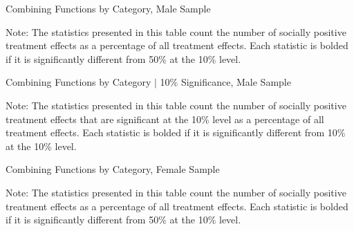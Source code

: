 	\begin{sidewaystable}[H]
	\begin{threeparttable}
     \caption{Combining Functions by Category, Male Sample} 
     \label{table:abccare_rslt_male_counts_n50a100_all}
	
		\begin{tablenotes}
	\footnotesize
	\item Note: The statistics presented in this table count the number of socially positive treatment 
	 effects as a percentage of all treatment effects. Each statistic is bolded if it is significantly
	 different from 50\% at the 10\% level.
	\end{tablenotes}
	\end{threeparttable}
	\end{sidewaystable}   

	\begin{sidewaystable}[H]
	\begin{threeparttable}
     \caption{Combining Functions by Category $|$ 10\% Significance, Male Sample} 
     \label{table:abccare_rslt_male_counts_n10a10_all}
	
	\begin{tablenotes}
	\footnotesize
	\item Note: The statistics presented in this table count the number of socially positive treatment 
	effects that are significant at the 10\% level as a percentage of all treatment effects. Each statistic
	is bolded if it is significantly different from 10\% at the 10\% level.
	\end{tablenotes}
	\end{threeparttable}
	\end{sidewaystable}   

	\begin{sidewaystable}[H]
	\begin{threeparttable}
     \caption{Combining Functions by Category, Female Sample} 
     \label{table:abccare_rslt_female_counts_n50a100_all}
	
	\begin{tablenotes}
	\footnotesize
	\item Note: The statistics presented in this table count the number of socially positive treatment 
	 effects as a percentage of all treatment effects. Each statistic is bolded if it is significantly
	 different from 50\% at the 10\% level.
	\end{tablenotes}
	\end{threeparttable}
	\end{sidewaystable}   

